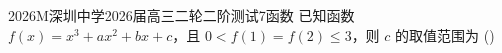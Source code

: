 
\begin{problem}{2026}{M}{深圳中学2026届高三二轮二阶测试}{7}{函数}
已知函数 $f(x)=x^3+ax^2+bx+c$，且 $0<f(1)=f(2)\leq3$，则 $c$ 的取值范围为 (\hspace{1cm})
\begin{choices}
\choice{{$(-6,-3]$}}
\choice{{$[-6,-3)$}}
\end{choices}
\end{problem}
